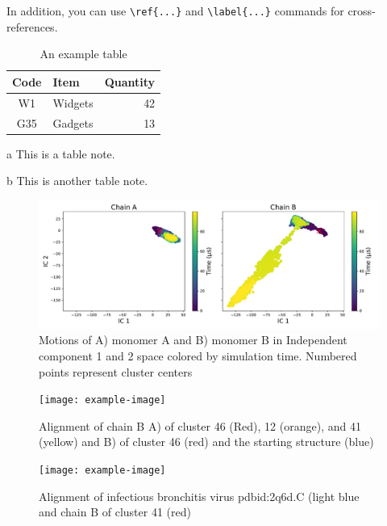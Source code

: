 \documentclass{biophys-new}
\begin{document}
In addition, you can use \verb|\ref{...}| and \verb|\label{...}| commands for cross-references.

\begin{table}[hbt!]
\caption{An example table}
\label{tab:widgets}
\centering

\begin{threeparttable}

\begin{tabular}{c l r}
\hline
Code & Item & Quantity \\\hline
W1 & Widgets\tnote{a} & 42 \\
G35 & Gadgets & 13\tnote{b} \\
\hline
\end{tabular}

\begin{tablenotes}
\item[a] This is a table note.
\item[b] This is another table note.
\end{tablenotes}

\end{threeparttable}

\end{table}

\begin{figure}[h]
\centering
\graphicspath{ {./figures/} }
\includegraphics[width=0.6\linewidth]{fig_1_fdiscolortime_ic2.pdf}
\caption{Motions of A) monomer A and B) monomer B in Independent component 1 and 2 space colored by simulation time. Numbered points represent cluster centers}
\label{fig:view}
\end{figure}

\begin{figure}[alignment-along-ic1]
\centering
\texttt{[image: example-image]}
\caption{Alignment of chain B A) of cluster 46 (Red), 12 (orange), and 41 (yellow) and B) of cluster 46 (red) and the starting structure (blue)}
\label{fig:view}
\end{figure}

\begin{figure}[alignment-linker-helix]
\centering
\texttt{[image: example-image]}
\caption{Alignment of infectious bronchitis virus pdbid:2q6d.C (light blue and chain B of cluster 41 (red)}
\label{fig:view}
\end{figure}
\end{document}
